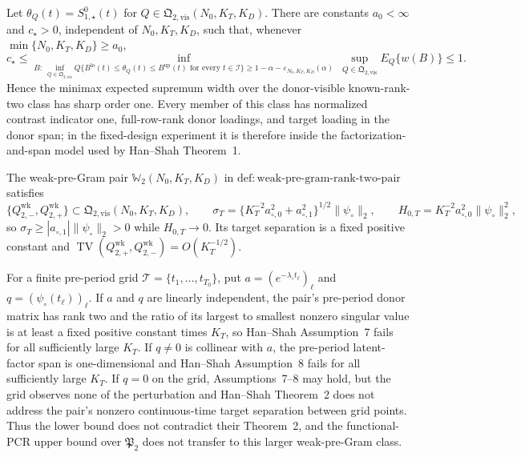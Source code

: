 Let \(\theta_Q(t)=S^0_{1,\star}(t)\) for \(Q\in\mathfrak Q_{2,\mathrm{vis}}(N_0,K_T,K_D)\).  There are constants \(a_0<\infty\) and \(c_\star>0\), independent of \(N_0,K_T,K_D\), such that, whenever \(\min\{N_0,K_T,K_D\}\ge a_0\),
\[
 c_\star\le
 \inf_{B:\ \inf_{Q\in\mathfrak Q_{2,\mathrm{vis}}}
 Q\{B^{\mathrm{lo}}(t)\le\theta_Q(t)\le B^{\mathrm{up}}(t)
 \text{ for every }t\in\mathcal I\}
 \ge1-\alpha-\varepsilon_{N_0,K_T,K_D}(\alpha)}
 \ \sup_{Q\in\mathfrak Q_{2,\mathrm{vis}}}E_Q\{w(B)\}
 \le1.
\]
Hence the minimax expected supremum width over the donor-visible known-rank-two class has sharp order one.  Every member of this class has normalized contrast indicator one, full-row-rank donor loadings, and target loading in the donor span; in the fixed-design experiment it is therefore inside the factorization-and-span model used by Han--Shah Theorem~1.

The weak-pre-Gram pair \(\mathbb W_2(N_0,K_T,K_D)\) in \(\mathrm{def:weak\mbox{-}pre\mbox{-}gram\mbox{-}rank\mbox{-}two\mbox{-}pair}\) satisfies
\[
 \{Q_{2,-}^{\mathrm{wk}},Q_{2,+}^{\mathrm{wk}}\}
 \subset\mathfrak Q_{2,\mathrm{vis}}(N_0,K_T,K_D),
 \qquad
 \sigma_T=\{K_T^{-2}a_{\circ,0}^2+a_{\circ,1}^2\}^{1/2}\|\psi_\circ\|_2,
 \qquad
 H_{0,T}=K_T^{-2}a_{\circ,0}^2\|\psi_\circ\|_2^2,
\]
so \(\sigma_T\ge|a_{\circ,1}|\|\psi_\circ\|_2>0\) while \(H_{0,T}\to0\).  Its target separation is a fixed positive constant and
\(\operatorname{TV}(Q_{2,+}^{\mathrm{wk}},Q_{2,-}^{\mathrm{wk}})=O(K_T^{-1/2})\).

For a finite pre-period grid \(\mathcal T=\{t_1,\ldots,t_{T_0}\}\), put \(a=(e^{-\lambda_\circ t_\ell})_\ell\) and \(q=(\psi_\circ(t_\ell))_\ell\).  If \(a\) and \(q\) are linearly independent, the pair's pre-period donor matrix has rank two and the ratio of its largest to smallest nonzero singular value is at least a fixed positive constant times \(K_T\), so Han--Shah Assumption~7 fails for all sufficiently large \(K_T\).  If \(q\ne0\) is collinear with \(a\), the pre-period latent-factor span is one-dimensional and Han--Shah Assumption~8 fails for all sufficiently large \(K_T\).  If \(q=0\) on the grid, Assumptions~7--8 may hold, but the grid observes none of the perturbation and Han--Shah Theorem~2 does not address the pair's nonzero continuous-time target separation between grid points.  Thus the lower bound does not contradict their Theorem~2, and the functional-PCR upper bound over \(\mathfrak P_2\) does not transfer to this larger weak-pre-Gram class.